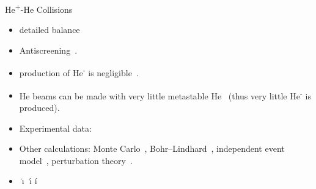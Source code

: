 \documentclass[letterpaper, 11 pt]{report}
\begin{document}
\begin{chapter}{\texorpdfstring{He\textsuperscript{+}}{He+}-He Collisions \label{chap:hephe}}
\begin{itemize}
      \item detailed balance~\cite[p.\ 143--152]{scattering}

      \item Antiscreening~\cite{as1, as2, as3, as4, as5}.

      \item production of He\textsuperscript{-} is negligible~\cite{neghe-neg}.

      \item He beams can be made with very little metastable He~\cite{metahe}
            (thus very little He\textsuperscript{-} is produced).

      \item Experimental data:~\cite{BS58, HN78, HSE78, dCFdP88, DT-88, Dub-89, ASL91, FTFHLP-95,
            SSMSM-11}

      \item Other calculations: Monte Carlo~\cite{CC-07, GMZ17}, Bohr–Lindhard~\cite{DYC-08, DLZ-12},
         independent event model~\cite{SM-03}, perturbation theory~\cite{BOC05, Mancev-07, MG-10,
         GG-12b}.

      \item $\acute{\imath}$ \'{\i} \'{i}

   \end{itemize}

\end{chapter}
\end{document}
